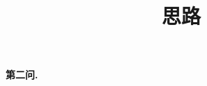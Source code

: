 \documentclass[12pt,a4paper,oneside]{ctexart}
\title{思路}
\date{}
\author{}
\begin{document}
  \maketitle

  \textbf{第二问.}
\end{document}
